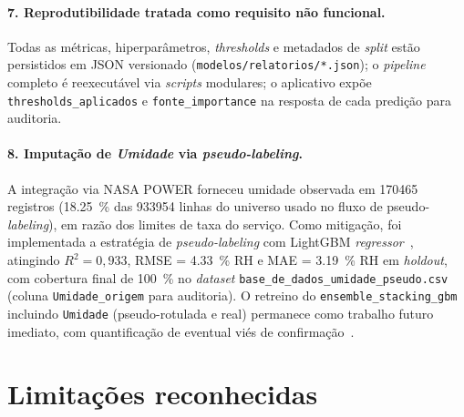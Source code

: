 \paragraph{7. Reprodutibilidade tratada como requisito não funcional.} Todas as métricas, hiperparâmetros, \emph{thresholds} e metadados de \emph{split} estão persistidos em JSON versionado (\texttt{modelos/relatorios/*.json}); o \emph{pipeline} completo é reexecutável via \emph{scripts} modulares; o aplicativo expõe \texttt{thresholds\_aplicados} e \texttt{fonte\_importance} na resposta de cada predição para auditoria.

\paragraph{8. Imputação de \emph{Umidade} via \emph{pseudo-labeling}.} A integração via NASA POWER forneceu umidade observada em \num{170465} registros (\SI{18,25}{\percent} das \num{933954} linhas do universo usado no fluxo de pseudo-\emph{labeling}), em razão dos limites de taxa do serviço. Como mitigação, foi implementada a estratégia de \emph{pseudo-labeling} com LightGBM \emph{regressor}~\cite{lee2013pseudo,lopezgarcia2024spatiotemporal}, atingindo \(R^2 = 0{,}933\), RMSE = \SI{4,33}{\percent} RH e MAE = \SI{3,19}{\percent} RH em \emph{holdout}, com cobertura final de \SI{100}{\percent} no \emph{dataset} \texttt{base\_de\_dados\_umidade\_pseudo.csv} (coluna \texttt{Umidade\_origem} para auditoria). O retreino do \texttt{ensemble\_stacking\_gbm} incluindo \texttt{Umidade} (pseudo-rotulada e real) permanece como trabalho futuro imediato, com quantificação de eventual viés de confirmação~\cite{arazo2020pseudo}.

\section{Limitações reconhecidas}
\label{sec:conclusao_limitacoes}

